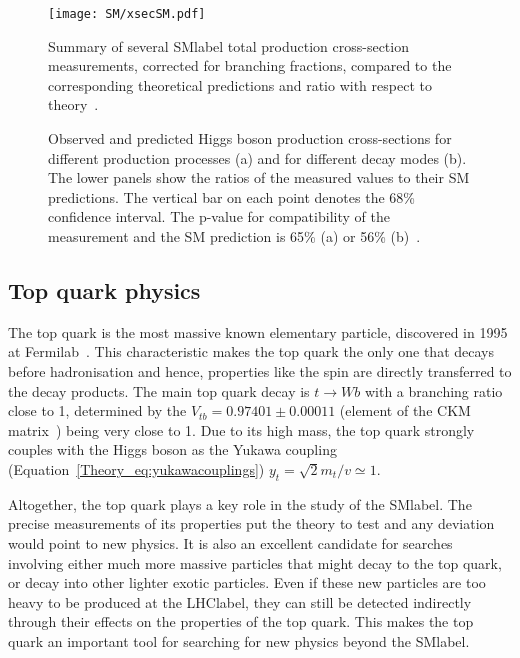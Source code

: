 \begin{figure}[htbp]
    \RawFloats
    \begin{center}
    \texttt{[image: SM/xsecSM.pdf]}
    \caption{
        Summary of several \acrshort{SMlabel} total production cross-section measurements, corrected for branching fractions, compared to the corresponding theoretical predictions and ratio with respect to theory~\cite{ATLAS:2022djm}. 
    }
    \label{figSM:xsecSM}
    \end{center}
\end{figure}

\begin{figure}[htbp]
    \RawFloats
    \begin{center}
        \quad
        \caption{
            Observed and predicted Higgs boson production cross-sections for different production processes (a) and for different decay modes (b). The lower panels show the ratios of the measured values to their SM predictions. The vertical bar on each point denotes the 68\% confidence interval. The p-value for compatibility of the measurement and the SM prediction is 65\% (a) or 56\% (b)~\cite{HiggssumaryAtlas2022}. 
    }
    \label{figSM:xsecBRH}
    \end{center}
\end{figure}

\clearpage
\subsection{Top quark physics}

The top quark is the most massive known elementary particle, discovered in 1995 at Fermilab~\cite{topsearch1995,PhysRevLett.74.2626}. This characteristic makes the top quark the only one that decays before hadronisation and hence, properties like the spin are directly transferred to the decay products. The main top quark decay is $t\to Wb$ with a branching ratio close to 1, determined by the $V_{tb}=0.97401 \pm 0.00011$ (element of the CKM matrix~\cite{pdg}) being very close to 1. Due to its high mass, the top quark strongly couples with the Higgs boson as the Yukawa coupling (Equation~\ref{Theory_eq:yukawacouplings}) $y_t=\sqrt{2}m_t/v\simeq 1$.

Altogether, the top quark plays a key role in the study of the \acrshort{SMlabel}. The precise measurements of its properties put the theory to test and any deviation would point to new physics. It is also an excellent candidate for searches involving either much more massive particles that might decay to the top quark, or decay into other lighter exotic particles. Even if these new particles are too heavy to be produced at the \acrshort{LHClabel}, they can still be detected indirectly through their effects on the properties of the top quark. This makes the top quark an important tool for searching for new physics beyond the \acrshort{SMlabel}.

